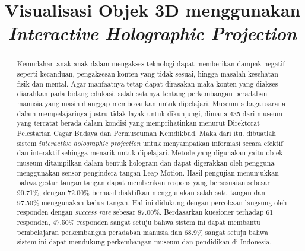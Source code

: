 \documentclass[conference]{IEEEtran}
\begin{document}
\title{Visualisasi Objek 3D menggunakan \textit{Interactive Holographic Projection}}
\author{
	\and
	\and
}
\maketitle
	
\begin{abstract}
	Kemudahan anak-anak dalam mengakses teknologi dapat memberikan dampak negatif seperti kecanduan, pengaksesan konten yang tidak sesuai, hingga masalah kesehatan fisik dan mental\cite{sundus2018impact}. Agar manfaatnya tetap dapat dirasakan maka konten yang diakses diarahkan pada bidang edukasi, salah satunya tentang perkembangan peradaban manusia yang masih dianggap membosankan untuk dipelajari\cite{wirawan_2018}. Museum sebagai sarana dalam mempelajarinya justru tidak layak untuk dikunjungi, dimana 435 dari museum yang tercatat berada dalam kondisi yang memprihatinkan menurut Direktorat Pelestarian Cagar Budaya dan Permuseuman Kemdikbud\cite{kemendikbud_2019}. Maka dari itu, dibuatlah sistem \textit{interactive holographic projection} untuk menyampaikan informasi secara efektif dan interaktif sehingga menarik untuk dipelajari. Metode yang digunakan yaitu objek museum ditampilkan dalam bentuk hologram dan dapat digerakkan oleh pengguna menggunakan sensor pengindera tangan Leap Motion. Hasil pengujian menunjukkan bahwa gestur tangan tangan dapat memberikan respons yang bersesuaian sebesar 90.71\%, dengan 72.00\% berhasil diaktifkan menggunakan salah satu tangan dan 97.50\% menggunakan kedua tangan. Hal ini didukung dengan percobaan langsung oleh responden dengan \textit{success rate} sebesar 87.00\%. Berdasarkan kuesioner terhadap 61 responden, 47.50\% responden sangat setuju bahwa sistem ini dapat membantu pembelajaran perkembangan peradaban manusia dan 68.9\% sangat setuju bahwa sistem ini dapat mendukung perkembangan museum dan pendidikan di Indonesia.
\end{abstract}
	
\end{document}
